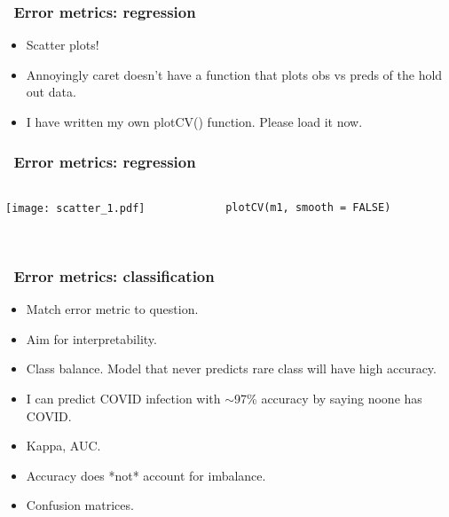 \documentclass[handout, aspectratio = 169]{beamer}
\begin{document}
\begin{frame}
\frametitle{\insertframenumber~Error metrics: regression}

\begin{itemize}
\item Scatter plots!
\item Annoyingly caret doesn't have a function that plots obs vs preds of the hold out data.
\item I have written my own plotCV() function. Please load it now.
\end{itemize}
\end{frame} 






  \begin{frame}[fragile]
\frametitle{\insertframenumber~Error metrics: regression}
\begin{columns}
\begin{column}{0.6\textwidth}  %
    \begin{center}
     \texttt{[image: scatter\_1.pdf]}
     \end{center}
\end{column}
\begin{column}{0.4\textwidth}
\begin{Verbatim}
plotCV(m1, smooth = FALSE)
            
\end{Verbatim}
\end{column}
\end{columns}
\end{frame}




\begin{frame}
\frametitle{\insertframenumber~Error metrics: classification}

\begin{itemize}
\item Match error metric to question.
\item Aim for interpretability.
\item Class balance. Model that never predicts rare class will have high accuracy.
\item I can predict COVID infection with $\sim$97\% accuracy by saying noone has COVID. 
\item Kappa, AUC.
\item Accuracy does *not* account for imbalance.
\item Confusion matrices.
\end{itemize}
\end{frame} 
\end{document}
